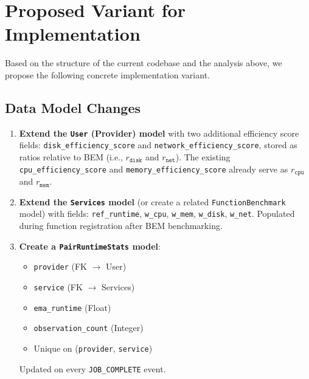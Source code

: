 \documentclass[11pt, a4paper]{article}
\newcommand{\bluecontentbegin}{\begingroup\color{blue!70!black}}
\begin{document}
\section{Proposed Variant for Implementation}
\label{sec:variant}
\bluecontentbegin

Based on the structure of the current codebase and the analysis
above, we propose the following concrete implementation variant.

\subsection{Data Model Changes}

\begin{enumerate}
    \item \textbf{Extend the \texttt{User} (Provider) model} with two
          additional efficiency score fields:
          \texttt{disk\_efficiency\_score} and
          \texttt{network\_efficiency\_score}, stored as ratios
          relative to BEM (i.e., $r_{\texttt{disk}}$ and
          $r_{\texttt{net}}$). The existing
          \texttt{cpu\_efficiency\_score} and
          \texttt{memory\_efficiency\_score} already serve as
          $r_{\texttt{cpu}}$ and $r_{\texttt{mem}}$.

    \item \textbf{Extend the \texttt{Services} model} (or create a
          related \texttt{FunctionBenchmark} model) with fields:
          \texttt{ref\_runtime}, \texttt{w\_cpu}, \texttt{w\_mem},
          \texttt{w\_disk}, \texttt{w\_net}. Populated during function
          registration after BEM benchmarking.

    \item \textbf{Create a \texttt{PairRuntimeStats} model}:
          \begin{itemize}
              \item \texttt{provider} (FK $\to$ User)
              \item \texttt{service} (FK $\to$ Services)
              \item \texttt{ema\_runtime} (Float)
              \item \texttt{observation\_count} (Integer)
              \item Unique on (\texttt{provider}, \texttt{service})
          \end{itemize}
          Updated on every \texttt{JOB\_COMPLETE} event.
\end{enumerate}
\end{document}

